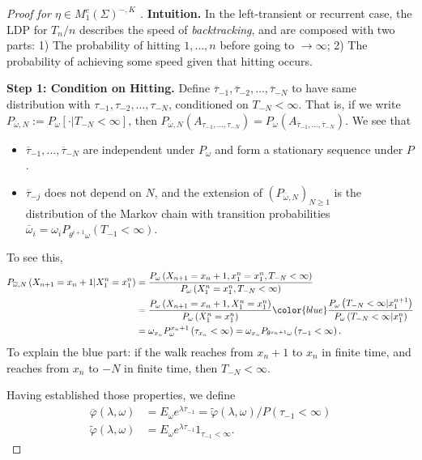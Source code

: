 \begin{proof}[Proof for $\eta \in M_1^e(\Sigma)^{-, K}$ ]
	\textbf{Intuition.} In the left-transient or recurrent case, the LDP for $T_n / n$ describes the speed of \textit{backtracking}, and are composed with two parts: 1) The probability of hitting $1, \ldots, n$ before going to $\to \infty $;  2) The probability of achieving some speed given that hitting occurs.

	\textbf{Step 1: Condition on Hitting.} Define $\overline{\tau} _{-1}, \overline{\tau} _{-2}, \ldots, \overline{\tau} _{-N}$ to have same distribution with $\tau_{-1}, \tau_{-2}, \ldots, \tau_{-N}$, conditioned on $T_{-N } < \infty $. That is, if we write $P_{\overline{\omega} , N} := P_\omega \left[ \cdot  | T_{-N} < \infty  \right] $, then $P_{\overline{\omega} , N}(A_{\tau_{-1}, \ldots, \tau_{-N}}) = P_\omega (A_{\overline{\tau} _{-1}, \ldots, \overline{\tau} _{-N}}) $. We see that
	\begin{itemize}
		\item $\overline{\tau} _{-1}, \ldots, \overline{\tau} _{-N}$ are independent under $P_\omega$ and form a stationary sequence under $P$.
		\item $\overline{\tau} _{-j}$ does not depend on $N$, and the extension of $\left( P_{\overline{\omega} , N} \right) _{N \ge 1}$ is the distribution of the Markov chain with transition probabilities $\overline{\omega} _i = \omega_i P_{\theta^{i + 1}\omega}(T_{-1} < \infty )$.
	\end{itemize}
	To see this,
	\begin{align*}
		P_{\overline{\omega} , N} \left( X_{n + 1} = x_n + 1 | X_1^n = x_1^n \right) 
		&= \frac{P_\omega \left( X_{n + 1} = x _{n} + 1 , x_1^n = x_1^n, T_{-N} < \infty  \right) }{P_\omega\left( X_1^n = x_1^n, T_{-N} < \infty  \right) } \\
		&= \frac{P_\omega\left( X_{n + 1} = x_{n} + 1, X_1^n = x_1^n \right)}{P_\omega\left( X_1^n = x_1^n \right) } 
		{\color{blue} \frac{P_\omega \left( T_{-N} < \infty  | x_1^{n + 1} \right) }{P_\omega \left( T_{-N }< \infty  | x_1^n \right) } }\\
		&= \omega_{x_n} P_\omega^{x_{n} + 1} \left( \tau_{x_n} < \infty  \right) = \omega_{x_n} P_{\theta^{x_n + 1} \omega}\left( \tau_{-1} < \infty  \right) 
	.\end{align*}
	To explain the blue part: if the walk reaches from $x_n + 1$ to $x_n$ in finite time, and reaches from $x_n$ to $-N$ in finite time, then $T_{-N} < \infty $.	

	Having established those properties, we define
	\begin{align*}
		\overline{\varphi} (\lambda, \omega) &= E_\omega e^{\lambda \overline{\tau} _{-1}} = \tilde \varphi(\lambda, \omega) / P(\tau_{-1} < \infty )\\
		\tilde \varphi (\lambda, \omega) &= E_\omega e^{\lambda \tau_{-1}} 1_{\tau_{-1} < \infty }
	.\end{align*}


\end{proof}
